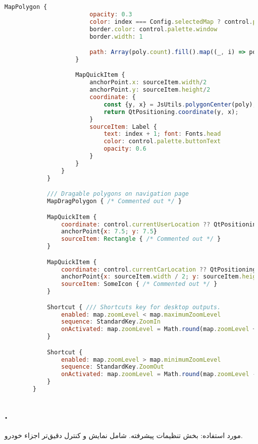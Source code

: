 \begin{latin}
\begin{lstlisting}[language=qml, caption={Navigation Page}]
					MapPolygon {
						opacity: 0.3
						color: index === Config.selectedMap ? control.palette.text : control.palette.highlight
						border.color: control.palette.window
						border.width: 1

						path: Array(poly.count).fill().map((_, i) => poly.get(i));
					}

					MapQuickItem {
						anchorPoint.x: sourceItem.width/2
						anchorPoint.y: sourceItem.height/2
						coordinate: {
							const {y, x} = JsUtils.polygonCenter(poly);
							return QtPositioning.coordinate(y, x);
						}
						sourceItem: Label {
							text: index + 1; font: Fonts.head
							color: control.palette.buttonText
							opacity: 0.6
						}
					}
				}
			}

			/// Dragable polygons on navigation page
			MapDragPolygon { /* Commented out */ }

			MapQuickItem {
				coordinate: control.currentUserLocation ?? QtPositioning.coordinate()
				anchorPoint{x: 7.5; y: 7.5}
				sourceItem: Rectangle { /* Commented out */ }
			}

			MapQuickItem {
				coordinate: control.currentCarLocation ?? QtPositioning.coordinate()
				anchorPoint{x: sourceItem.width / 2; y: sourceItem.height / 2}
				sourceItem: SomeIcon { /* Commented out */ }
			}

			Shortcut { /// Shortcuts key for desktop outputs.
				enabled: map.zoomLevel < map.maximumZoomLevel
				sequence: StandardKey.ZoomIn
				onActivated: map.zoomLevel = Math.round(map.zoomLevel + 1);
			}

			Shortcut {
				enabled: map.zoomLevel > map.minimumZoomLevel
				sequence: StandardKey.ZoomOut
				onActivated: map.zoomLevel = Math.round(map.zoomLevel - 1);
			}
		}
	\end{lstlisting}
\end{latin}

\subsection{.}
مورد استفاده: بخش تنظیمات پیشرفته.
شامل نمایش و کنترل دقیق‌تر اجزاء خودرو.

